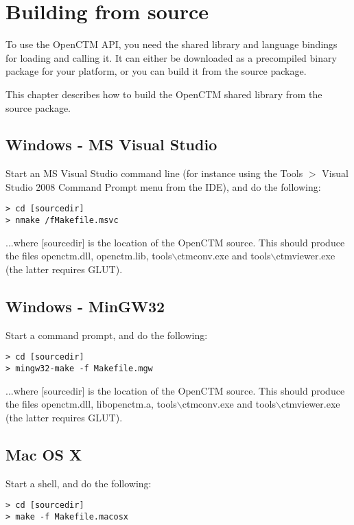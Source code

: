
\chapter{Building from source}
To use the OpenCTM API, you need the shared library and language bindings
for loading and calling it. It can either be downloaded as a precompiled binary
package for your platform, or you can build it from the source package.

This chapter describes how to build the OpenCTM shared library from the source
package.

\section{Windows - MS Visual Studio}
Start an MS Visual Studio command line (for instance using the Tools $>$
Visual Studio 2008 Command Prompt menu from the IDE), and do the following:

\begin{lstlisting}
> cd [sourcedir]
> nmake /fMakefile.msvc
\end{lstlisting}

...where [sourcedir] is the location of the OpenCTM source. This should produce the
files openctm.dll, openctm.lib, tools$\backslash$ctmconv.exe and
tools$\backslash$ctmviewer.exe (the latter requires GLUT).


\section{Windows - MinGW32}
Start a command prompt, and do the following:

\begin{lstlisting}
> cd [sourcedir]
> mingw32-make -f Makefile.mgw
\end{lstlisting}

...where [sourcedir] is the location of the OpenCTM source. This should produce the
files openctm.dll, libopenctm.a, tools$\backslash$ctmconv.exe and
tools$\backslash$ctmviewer.exe (the latter requires GLUT).


\section{Mac OS X}
Start a shell, and do the following:

\begin{lstlisting}
> cd [sourcedir]
> make -f Makefile.macosx
\end{lstlisting}

